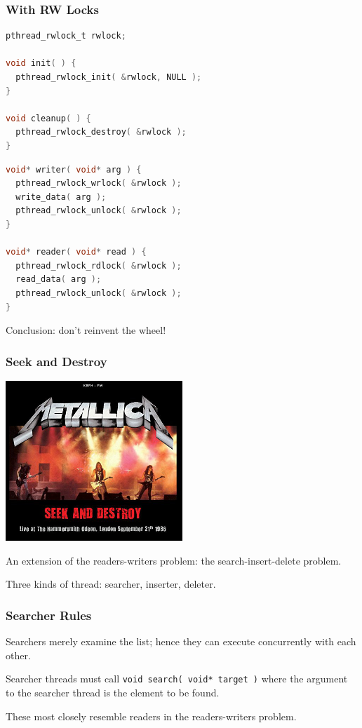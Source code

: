 \begin{frame}[fragile]
	\frametitle{With RW Locks}

	\begin{multicols}{2}
		\begin{lstlisting}[language=C]
pthread_rwlock_t rwlock;

void init( ) {
  pthread_rwlock_init( &rwlock, NULL );
}

void cleanup( ) {
  pthread_rwlock_destroy( &rwlock );
}
\end{lstlisting}

		\columnbreak

		\begin{lstlisting}[language=C]
void* writer( void* arg ) {
  pthread_rwlock_wrlock( &rwlock );
  write_data( arg );
  pthread_rwlock_unlock( &rwlock );
}

void* reader( void* read ) {
  pthread_rwlock_rdlock( &rwlock );
  read_data( arg );
  pthread_rwlock_unlock( &rwlock );
}
\end{lstlisting}

	\end{multicols}

	Conclusion: don't reinvent the wheel!

\end{frame}


\begin{frame}
	\frametitle{Seek and Destroy}

	\begin{center}
		\includegraphics[width=0.5\textwidth]{images/seek-and-destroy.jpg}
	\end{center}
	An extension of the readers-writers problem: the search-insert-delete problem.

	Three kinds of thread: searcher, inserter, deleter.

\end{frame}


\begin{frame}
	\frametitle{Searcher Rules}

	\alert{Searchers} merely examine the list; hence they can execute concurrently with each other.

	Searcher threads must call \texttt{void search( void* target )} where the argument to the searcher thread is the element to be found.

	These most closely resemble readers in the readers-writers problem.

\end{frame}

